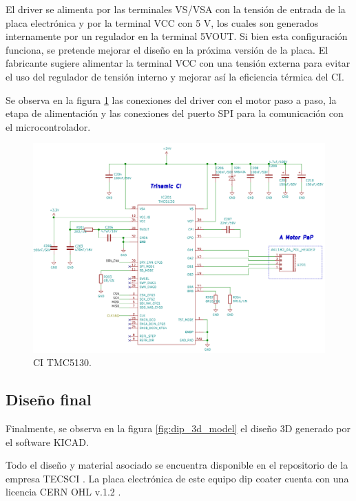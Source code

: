 El driver se alimenta por las terminales VS/VSA con la tensión de entrada de la placa electrónica y por la terminal VCC con 5 V, los cuales son generados internamente  por un regulador en la terminal 5VOUT. Si bien esta configuración funciona, se pretende mejorar el diseño en la próxima versión de la placa. El fabricante sugiere alimentar la terminal VCC con una tensión externa para evitar el uso del regulador de tensión interno y mejorar así la eficiencia térmica del CI.

Se observa en la figura \ref{fig:kicad_trinamic} las conexiones del driver con el motor paso a paso, la etapa de alimentación y las conexiones del puerto SPI para la comunicación con el microcontrolador. 
 
\begin{figure}[h!]
	\centering
	\includegraphics[width=1\textwidth]{./Figures/kicad_trinamic.png}
	\caption{CI TMC5130.}
	\label{fig:kicad_trinamic}
\end{figure} 

  
\subsection{Diseño final}  
Finalmente, se observa en la figura \ref{fig:dip_3d_model} el diseño 3D generado por el software KICAD.

Todo el diseño y material asociado se encuentra disponible en el repositorio de la empresa TECSCI \citep{web_hardware_tecsci}. La placa electrónica de este equipo dip coater cuenta con una licencia CERN OHL v.1.2 \citep{web_cern_licence}.


